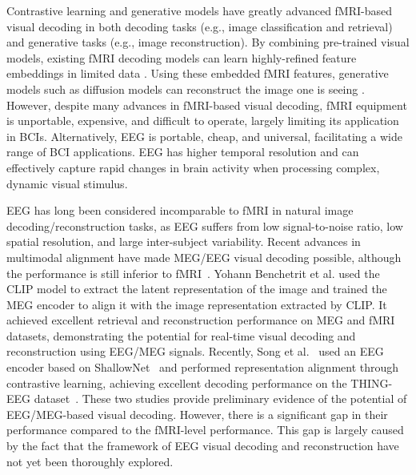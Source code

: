 \documentclass{article}
\begin{document}
Contrastive learning and generative models have greatly advanced fMRI-based visual decoding in both decoding tasks (e.g., image classification and retrieval) and generative tasks (e.g., image reconstruction). By combining pre-trained visual models, existing fMRI decoding models can learn highly-refined feature embeddings in limited data \cite{liu2023brainclip,scotti2023reconstructing}. Using these embedded fMRI features, generative models such as diffusion models can reconstruct the image one is seeing \cite{scotti2023reconstructing,fang2023alleviating}.
However, despite many advances in fMRI-based visual decoding, fMRI equipment is unportable, expensive, and difficult to operate, largely limiting its application in BCIs. Alternatively, EEG is portable, cheap, and universal, facilitating a wide range of BCI applications. EEG has higher temporal resolution and can effectively capture rapid changes in brain activity when processing complex, dynamic visual stimulus. %


EEG has long been considered incomparable to fMRI in natural image decoding/reconstruction tasks, as EEG suffers from low signal-to-noise ratio, low spatial resolution, and large inter-subject variability. Recent advances in multimodal alignment have made MEG/EEG visual decoding possible, although the performance is still inferior to fMRI~\cite{cichy2017multivariate,song2023decoding,grootswagers2022human}. Yohann Benchetrit et al. used the CLIP model to extract the latent representation of the image and trained the MEG encoder to align it with the image representation extracted by CLIP. It achieved excellent retrieval and reconstruction performance on MEG and fMRI datasets, demonstrating the potential for real-time visual decoding and reconstruction using EEG/MEG signals. 
Recently, Song et al.~\cite{song2023decoding} used an EEG encoder based on ShallowNet~\cite{schirrmeister2017deep} and performed representation alignment through contrastive learning, achieving excellent decoding performance on the THING-EEG dataset~\cite{gifford2022large}. 
These two studies provide preliminary evidence of the potential of EEG/MEG-based visual decoding. However, there is a significant gap in their performance compared to the fMRI-level performance. This gap is largely caused by the fact that the framework of EEG visual decoding and reconstruction have not yet been thoroughly explored.
\end{document}
